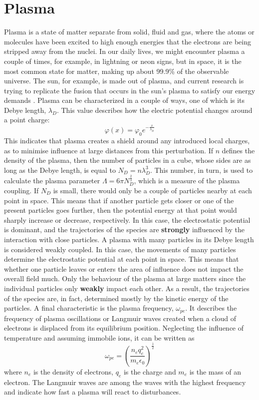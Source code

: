 \section{Plasma}
\label{sec: intro plasma}
\color{red}
Plasma is a state of matter separate from solid, fluid and gas, where the atoms or molecules have been excited to high enough energies that the electrons are being stripped away from the nuclei. In our daily lives, we might encounter plasma a couple of times, for example, in lightning or neon signs, but in space, it is the most common state for matter, making up about 99.9\% of the observable universe\cite{noauthor_plasma_nodate}. The sun, for example, is made out of plasma, and current research is trying to replicate the fusion that occurs in the sun's plasma to satisfy our energy demands \cite{degrave_magnetic_2022}.  
\newline
Plasma can be characterized in a couple of ways, one of which is its Debye length, $\lambda_D$. This value describes how the electric potential changes around a point charge:
\[\varphi(x) = \varphi_0 e^{-\frac{x}{\lambda_D}}\]  
This indicates that plasma creates a shield around any introduced local charges, as to minimise influence at large distances from this perturbation. If $n$ defines the density of the plasma, then the number of particles in a cube, whose sides are as long as the Debye length, is equal to $N_{D} = n \lambda_D^3$. This number, in turn, is used to calculate the plasma parameter $\Lambda = 6 \pi N_D^{\frac{2}{3}}$, which is a measure of the plasma coupling. If $N_D$ is small, there would only be a couple of particles nearby at each point in space. This means that if another particle gets closer or one of the present particles goes further, then the potential energy at that point would sharply increase or decrease, respectively. In this case, the electrostatic potential is dominant, and the trajectories of the species are \textbf{strongly} influenced by the interaction with close particles.
 A plasma with many particles in its Debye length is considered weakly coupled. In this case, the movements of many particles determine the electrostatic potential at each point in space. This means that whether one particle leaves or enters the area of influence does not impact the overall field much. Only the behaviour of the plasma at large matters since the individual particles only \textbf{weakly} impact each other. As a result, the trajectories of the species are, in fact, determined mostly by the kinetic energy of the particles.\cite{giovanni_lapenta_introduction_nodate}
\newline
A final characteristic is the plasma frequency, $\omega_{pe}$. It describes the frequency of plasma oscillations or Langmuir waves created when a cloud of electrons is displaced from its equilibrium position. Neglecting the influence of temperature and assuming immobile ions, it can be written as
 \[\omega_{pe} = \left(\frac{n_e q_e^2}{m_e\epsilon_0}\right)^{\frac{1}{2}}\]
 where $n_e$ is the density of electrons, $q_e$ is the charge and $m_e$ is the mass of an electron. The Langmuir waves are among the waves with the highest frequency and indicate how fast a plasma will react to disturbances.\cite{giovanni_lapenta_introduction_nodate}

